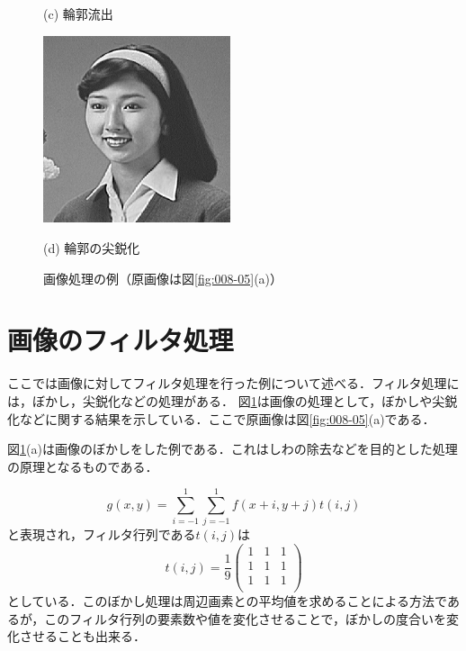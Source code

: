 \begin{figure}[H]
\begin{center}
\begin{minipage}{6cm}
\begin{center}
(c) 輪郭流出
\end{center}
\end{minipage}
\begin{minipage}{6cm}
\begin{center}
\includegraphics[width=5.5cm]{fig/hair1_sharp.eps}

(d) 輪郭の尖鋭化
\end{center}
\end{minipage}
\end{center}
\caption{画像処理の例（原画像は図\ref{fig:008-05}(a)）}
\label{fig:008-07}
\end{figure}

\section{画像のフィルタ処理}

ここでは画像に対してフィルタ処理を行った例について述べる．フィルタ処理には，ぼかし，尖鋭化などの処理がある．
%
図\ref{fig:008-07}は画像の処理として，ぼかしや尖鋭化などに関する結果を示している．ここで原画像は図\ref{fig:008-05}(a)である．

図\ref{fig:008-07}(a)は画像のぼかしをした例である．これはしわの除去などを目的とした処理の原理となるものである．

\begin{equation}
g(x,y)=\sum_{i=-1}^{1} \sum_{j=-1}^{1} f(x+i,y+j)t(i,j)
\end{equation}
と表現され，フィルタ行列である$t(i,j)$は
\begin{equation}
t(i,j)=\frac{1}{9} \left (
\begin{array}{ccc}
1 & 1 & 1 \\
1 & 1 & 1 \\
1 & 1 & 1 \\
\end{array}
\right )
\end{equation}
としている．このぼかし処理は周辺画素との平均値を求めることによる方法であるが，このフィルタ行列の要素数や値を変化させることで，ぼかしの度合いを変化させることも出来る．


